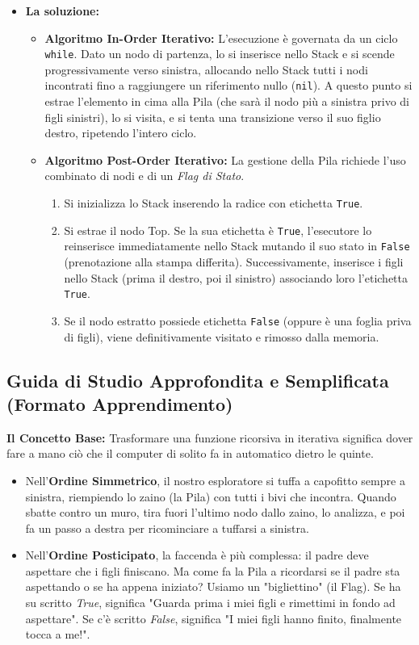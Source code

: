 \documentclass[a4paper, 11pt]{report}
\begin{document}
\begin{itemize}
    \item \textbf{La soluzione:}
    \begin{itemize}
        \item \textbf{Algoritmo In-Order Iterativo:} L'esecuzione è governata da un ciclo \texttt{while}. Dato un nodo di partenza, lo si inserisce nello Stack e si scende progressivamente verso sinistra, allocando nello Stack tutti i nodi incontrati fino a raggiungere un riferimento nullo (\texttt{nil}).
        A questo punto si estrae l'elemento in cima alla Pila (che sarà il nodo più a sinistra privo di figli sinistri), lo si visita, e si tenta una transizione verso il suo figlio destro, ripetendo l'intero ciclo.
        \item \textbf{Algoritmo Post-Order Iterativo:} La gestione della Pila richiede l'uso combinato di nodi e di un \textit{Flag di Stato}.
        \begin{enumerate}
            \item Si inizializza lo Stack inserendo la radice con etichetta \texttt{True}.
            \item Si estrae il nodo Top. Se la sua etichetta è \texttt{True}, l'esecutore lo reinserisce immediatamente nello Stack mutando il suo stato in \texttt{False} (prenotazione alla stampa differita). Successivamente, inserisce i figli nello Stack (prima il destro, poi il sinistro) associando loro l'etichetta \texttt{True}.
            \item Se il nodo estratto possiede etichetta \texttt{False} (oppure è una foglia priva di figli), viene definitivamente visitato e rimosso dalla memoria.
        \end{enumerate}
    \end{itemize}
\end{itemize}

\vspace{0.5cm}
\subsection*{Guida di Studio Approfondita e Semplificata (Formato Apprendimento)}


\textbf{Il Concetto Base:}
Trasformare una funzione ricorsiva in iterativa significa dover fare a mano ciò che il computer di solito fa in automatico dietro le quinte.
\begin{itemize}
    \item Nell'\textbf{Ordine Simmetrico}, il nostro esploratore si tuffa a capofitto sempre a sinistra, riempiendo lo zaino (la Pila) con tutti i bivi che incontra. Quando sbatte contro un muro, tira fuori l'ultimo nodo dallo zaino, lo analizza, e poi fa un passo a destra per ricominciare a tuffarsi a sinistra.
    \item Nell'\textbf{Ordine Posticipato}, la faccenda è più complessa: il padre deve aspettare che i figli finiscano. Ma come fa la Pila a ricordarsi se il padre sta aspettando o se ha appena iniziato? Usiamo un "bigliettino" (il Flag). Se ha su scritto \textit{True}, significa "Guarda prima i miei figli e rimettimi in fondo ad aspettare". Se c'è scritto \textit{False}, significa "I miei figli hanno finito, finalmente tocca a me!".
\end{itemize}
\end{document}
